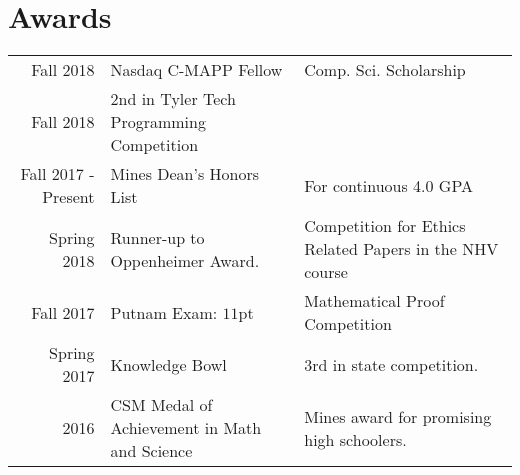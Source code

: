 \documentclass[]{deedy-resume-openfont}
\begin{document}
\begin{minipage}[t]{0.55\textwidth}

%
%

\end{minipage} 


\section{Awards} 
\begin{tabular}{rll}
Fall 2018 & Nasdaq C-MAPP Fellow & Comp. Sci. Scholarship \\
Fall 2018 & 2nd in Tyler Tech Programming Competition & \\
Fall 2017 - Present & Mines Dean's Honors List & For continuous 4.0 GPA \\
Spring 2018 & Runner-up to Oppenheimer Award. & Competition for Ethics Related Papers in the NHV course \\
Fall 2017 & Putnam Exam: \(11\)pt & Mathematical Proof Competition \\
Spring 2017 & Knowledge Bowl & 3rd in state competition. \\
2016	     & CSM Medal of Achievement in Math and Science & Mines award for promising high schoolers. \\
\end{tabular}
\end{document}

